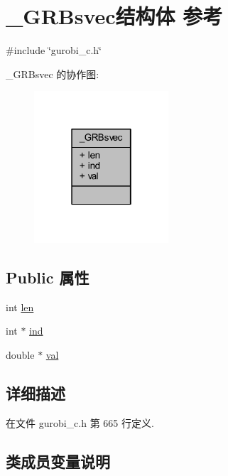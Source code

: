 \hypertarget{struct__GRBsvec}{}\section{\+\_\+\+G\+R\+Bsvec结构体 参考}
\label{struct__GRBsvec}


{\ttfamily \#include \char`\"{}gurobi\+\_\+c.\+h\char`\"{}}



\+\_\+\+G\+R\+Bsvec 的协作图\+:
\nopagebreak
\begin{figure}[H]
\begin{center}
\leavevmode
\includegraphics[width=142pt]{struct__GRBsvec__coll__graph}
\end{center}
\end{figure}
\subsection*{Public 属性}
\begin{DoxyCompactItemize}
\item 
int \hyperlink{struct__GRBsvec_a66e2892be214468f89d8512430a14428}{len}
\item 
int $\ast$ \hyperlink{struct__GRBsvec_a4a00220bb01e90ee6ce1f79b26a60095}{ind}
\item 
double $\ast$ \hyperlink{struct__GRBsvec_abb0d4946d18c0bcb33a0e132cb470c01}{val}
\end{DoxyCompactItemize}


\subsection{详细描述}


在文件 gurobi\+\_\+c.\+h 第 665 行定义.



\subsection{类成员变量说明}
